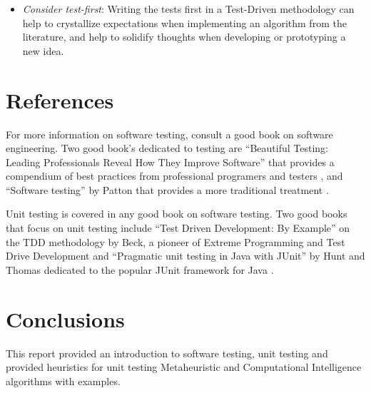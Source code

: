 \documentclass[a4paper, 11pt]{article}
\begin{document}
\begin{itemize}
	\item \emph{Consider test-first}: Writing the tests first in a Test-Driven methodology can help to crystallize expectations when implementing an algorithm from the literature, and help to solidify thoughts when developing or prototyping a new idea.
\end{itemize}

% 
% 
\section{References}
\label{sec:refs}
For more information on software testing, consult a good book on software engineering. Two good book's dedicated to testing are ``Beautiful Testing: Leading Professionals Reveal How They Improve Software'' that provides a compendium of best practices from professional programers and testers \cite{Goucher2009}, and ``Software testing'' by Patton that provides a more traditional treatment \cite{Patton2005}.

Unit testing is covered in any good book on software testing.
Two good books that focus on unit testing include ``Test Driven Development: By Example'' on the TDD methodology by Beck, a pioneer of Extreme Programming and Test Drive Development \cite{Beck2002} and ``Pragmatic unit testing in Java with JUnit'' by Hunt and Thomas dedicated to the popular JUnit framework for Java \cite{Hunt2003}.

\section{Conclusions}
\label{sec:conclusions}
This report provided an introduction to software testing, unit testing and provided heuristics for unit testing Metaheuristic and Computational Intelligence algorithms with examples.




\end{document}
